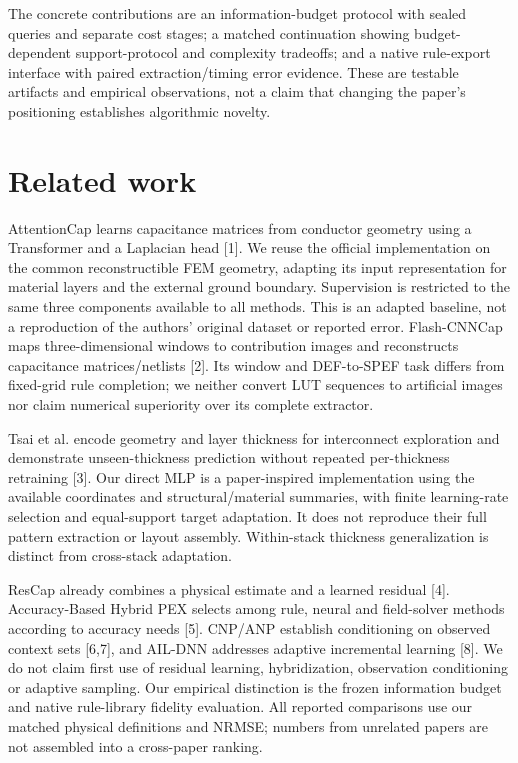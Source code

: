 \documentclass[10pt,twocolumn]{article}
\begin{document}
The concrete contributions are an information-budget protocol with sealed queries and separate cost stages; a matched continuation showing budget-dependent support-protocol and complexity tradeoffs; and a native rule-export interface with paired extraction/timing error evidence. These are testable artifacts and empirical observations, not a claim that changing the paper's positioning establishes algorithmic novelty.

\section*{Related work}

AttentionCap learns capacitance matrices from conductor geometry using a Transformer and a Laplacian head [1]. We reuse the official implementation on the common reconstructible FEM geometry, adapting its input representation for material layers and the external ground boundary. Supervision is restricted to the same three components available to all methods. This is an adapted baseline, not a reproduction of the authors' original dataset or reported error. Flash-CNNCap maps three-dimensional windows to contribution images and reconstructs capacitance matrices/netlists [2]. Its window and DEF-to-SPEF task differs from fixed-grid rule completion; we neither convert LUT sequences to artificial images nor claim numerical superiority over its complete extractor.

Tsai et al. encode geometry and layer thickness for interconnect exploration and demonstrate unseen-thickness prediction without repeated per-thickness retraining [3]. Our direct MLP is a paper-inspired implementation using the available coordinates and structural/material summaries, with finite learning-rate selection and equal-support target adaptation. It does not reproduce their full pattern extraction or layout assembly. Within-stack thickness generalization is distinct from cross-stack adaptation.

ResCap already combines a physical estimate and a learned residual [4]. Accuracy-Based Hybrid PEX selects among rule, neural and field-solver methods according to accuracy needs [5]. CNP/ANP establish conditioning on observed context sets [6,7], and AIL-DNN addresses adaptive incremental learning [8]. We do not claim first use of residual learning, hybridization, observation conditioning or adaptive sampling. Our empirical distinction is the frozen information budget and native rule-library fidelity evaluation. All reported comparisons use our matched physical definitions and NRMSE; numbers from unrelated papers are not assembled into a cross-paper ranking.
\end{document}

